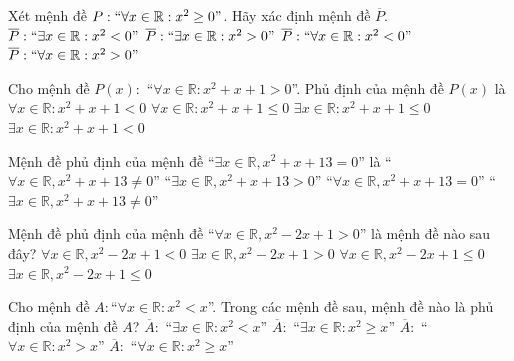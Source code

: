 \begin{ex}%
	Xét mệnh đề $P: \lq\lq\forall x\in\mathbb{R}:  x^2\geq 0"$. Hãy xác định mệnh đề $\overline{P}.$
	\choice 
		 {\True $\overline{P}:\lq\lq\exists x\in\mathbb{R}: x^2<0"$}
		{$\overline{P}:\lq\lq\exists x\in\mathbb{R}:  x^2>0"$}
		 {$\overline{P}:\lq\lq\forall x\in\mathbb{R}: x^2<0"$}
		{$\overline{P}:\lq\lq\forall  x\in\mathbb{R}: x^2>0"$}
\end{ex}

\begin{ex}%
	Cho mệnh đề $P(x)\colon$ ``$\forall x\in\mathbb{R}\colon x^2+x+1>0$''. Phủ định của mệnh đề $P(x)$  là
	 \choice
		{ $\forall x\in\mathbb{R}\colon  x^2+x+1<0$}
		{$\forall x\in\mathbb{R}\colon  x^2+x+1\leq 0$}
		 {\True $\exists x\in\mathbb{R}\colon x^2+x+1\leq 0$}
		{$\exists x\in\mathbb{R}\colon x^2+x+1<  0$}
\end{ex}

\begin{ex}%
	Mệnh đề phủ định  của mệnh đề “$\exists x\in \mathbb{R}, x^2+x+13=0$” là
	\choice 
		{\True “$\forall x\in \mathbb{R}, x^2+x+13\ne 0$”} 
		 {“$\exists x\in \mathbb{R}, x^2+x+13>0$”}
		{“$\forall x\in \mathbb{R}, x^2+x+13=0$”} 
		{“$\exists x\in \mathbb{R},  x^2+x+13\ne 0$”}
\end{ex}

\begin{ex}%
	Mệnh đề phủ định của mệnh  đề ``$\forall x\in \mathbb{R}, x^2-2x+1>0$'' là mệnh đề nào sau đây?
	 \choice
		{$\forall x\in  \mathbb{R}, x^2-2x+1<0$}
		 {$\exists x\in \mathbb{R}, x^2-2x+1>0$}
		{$\forall  x\in \mathbb{R}, x^2-2x+1\le 0$}
		 {\True $\exists x\in \mathbb{R}, x^2-2x+1\le 0$}
\end{ex}

\begin{ex}%
	Cho mệnh đề $A \colon$``$\forall x\in\mathbb{R}:x^2<x$''. Trong các mệnh đề sau, mệnh đề nào là phủ định của mệnh đề $A$? 
	\choice 
		{$\overline{A}  :$ ``$\exists x\in\mathbb{R}:x^2<x $''}
		{\True $\overline{A} :$ ``$\exists x\in\mathbb{R}:x^2\geq x$''} 
		{$\overline{A}  :$ ``$ \forall x\in\mathbb{R}:x^2>x$''}
		 {$\overline{A} :$ ``$\forall x\in\mathbb{R}:x^2\geq x$''}
\end{ex}

